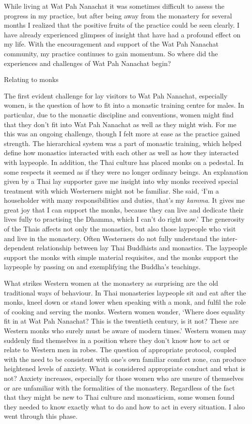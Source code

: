 While living at Wat Pah Nanachat it was sometimes difficult to assess
the progress in my practice, but after being away from the monastery for
several months I realized that the positive fruits of the practice could
be seen clearly. I have already experienced glimpses of insight that
have had a profound effect on my life. With the encouragement and
support of the Wat Pah Nanachat community, my practice continues to gain
momentum. So where did the experiences and challenges of Wat Pah
Nanachat begin?

Relating to monks

The first evident challenge for lay visitors to Wat Pah Nanachat,
especially women, is the question of how to fit into a monastic training
centre for males. In particular, due to the monastic discipline and
conventions, women might find that they don't fit into Wat Pah Nanachat
as well as they might wish. For me this was an ongoing challenge, though
I felt more at ease as the practice gained strength. The hierarchical
system was a part of monastic training, which helped define how
monastics interacted with each other as well as how they interacted with
laypeople. In addition, the Thai culture has placed monks on a pedestal.
In some respects it seemed as if they were no longer ordinary beings. An
explanation given by a Thai lay supporter gave me insight into why monks
received special treatment with which Westerners might not be familiar.
She said, `I'm a householder with many responsibilities and duties,
that's my \emph{kamma}. It gives me great joy that I can support the
monks, because they can live and dedicate their lives fully to
practising the Dhamma, which I can't do right now.' The generosity of
the Thais affects not only the monastics, but also those laypeople who
visit and live in the monastery. Often Westerners do not fully
understand the inter-dependent relationship between lay Thai Buddhists
and monastics. The laypeople support the monks with simple material
requisites, and the monks support the laypeople by passing on and
exemplifying the Buddha's teachings.

What strikes Western women at the monastery as surprising are the old
traditional ways of behaviour. In Thai monasteries laypeople sit and eat
after the monks, kneel down or stand lower when speaking with a monk,
and fulfil the role of cooking and serving the monks. Western women
wonder, `Where does equality fit in at Wat Pah Nanachat? This is the
twentieth century, is it not? These are Western monks who surely must be
aware of modern times.' Western women may suddenly find themselves in a
position where they don't know how to act or relate to Western men in
robes. The question of appropriate protocol, coupled with the need to be
consistent with one's own familiar comfort zone, can produce heightened
levels of anxiety. What is considered appropriate conduct and what is
not? Anxiety increases, especially for those women who are unsure of
themselves or are unfamiliar with the formalities of the monastery.
Regardless of the fact that they might be new to Thai culture and
monasticism, some women found they needed to know exactly what to do and
how to act in every situation. I also went through this phase.

